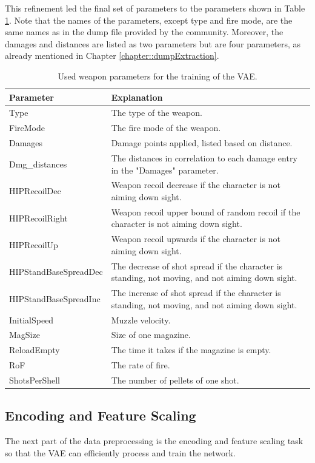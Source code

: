 \documentclass[MGS,Master,english]{twbook}%
\begin{document}
This refinement led the final set of parameters to the parameters shown in Table \ref{table::bf1::usedParams}. Note that the names of the parameters, except type and fire mode, are the same names as in the dump file provided by the  community. Moreover, the damages and distances are listed as two parameters but are four parameters, as already mentioned in Chapter \ref{chapter::dumpExtraction}.
\begin{table}[!ht]
	\centering
	\begin{tabular}{|l|p{10.8cm}|}
		\hline
		\textbf{Parameter} & \textbf{Explanation} \\ \hline
		Type & The type of the weapon. \\ \hline
		FireMode & The fire mode of the weapon. \\ \hline
		Damages & Damage points applied, listed based on distance. \\ \hline
		Dmg\_distances & The distances in correlation to each damage entry in the "Damages" parameter. \\ \hline
		HIPRecoilDec & Weapon recoil decrease if the character is not aiming down sight. \\ \hline
		HIPRecoilRight & Weapon recoil upper bound of random recoil if the character is not aiming down sight. \\ \hline
		HIPRecoilUp & Weapon recoil upwards if the character is not aiming down sight. \\ \hline
		HIPStandBaseSpreadDec & The decrease of shot spread if the character is standing, not moving, and not aiming down sight. \\ \hline
		HIPStandBaseSpreadInc & The increase of shot spread if the character is standing, not moving, and not aiming down sight. \\ \hline
		InitialSpeed & Muzzle velocity. \\ \hline
		MagSize & Size of one magazine. \\ \hline
		ReloadEmpty & The time it takes if the magazine is empty. \\ \hline
		RoF & The rate of fire. \\ \hline
		ShotsPerShell & The number of pellets of one shot. \\ \hline
	\end{tabular}
	\caption{Used weapon parameters for the training of the \ac{VAE}.}
	\label{table::bf1::usedParams}
\end{table}

\subsection{Encoding and Feature Scaling}
The next part of the data preprocessing is the encoding and feature scaling task so that the \ac{VAE} can efficiently process and train the network. 
\end{document}
